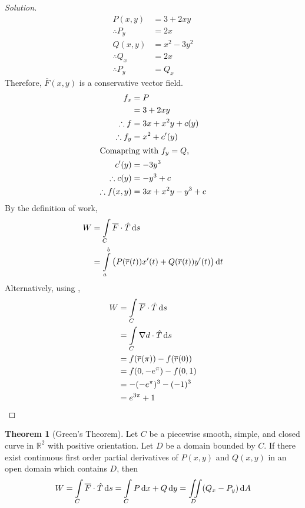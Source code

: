\documentclass[fleqn, a4paper, 10pt]{article}
\theoremstyle{definition}
\theoremstyle{theorem}
\newtheorem{theorem}{Theorem}
\theoremstyle{remark}
\newenvironment{solution}
	{\begin{proof}[Solution]\let\qed\relax}
	{\end{proof}}
\begin{document}
\begin{multicols}{2}
\begin{solution}
	\begin{align*}
		P(x,y) &= 3 + 2xy\\
		\therefore P_y &= 2x\\
		Q(x,y) &= x^2 - 3 y^2\\
		\therefore Q_x &= 2x\\
		\therefore P_y &= Q_x
	\end{align*}
	Therefore, $\overline{F}(x,y)$ is a conservative vector field.
	\begin{align*}
		f_x &= P\\
		&= 3 + 2 x y\\
		\therefore f &= 3x + x^2 y + c(y)\\
		\therefore f_y &= x^2 + c'(y)\\
		\intertext{Comapring with $f_y = Q$,}
		c'(y) &= -3 y^3\\
		\therefore c(y) &= - y^3 + c\\
		\therefore f(x,y) &= 3x + x^2 y - y^3 + c
	\end{align*}
	By the definition of work,
	\begin{align*}
		W &= \int\limits_{C} \overline{F} \cdot \hat{T} \dif s\\
		&= \int\limits_{a}^{b} \left( P(\overline{r}(t)) x'(t) + Q(\overline{r}(t)) y'(t) \right) \dif t
	\end{align*}
	Alternatively, using ,
	\begin{align*}
		W &= \int\limits_{C} \overline{F} \cdot \hat{T} \dif s\\
		&= \int\limits_{C} \nabla d \cdot \hat{T} \dif s\\
		&= f(\overline{r}(\pi)) - f(\overline{r}(0))\\
		&= f(0, -e^{\pi}) - f(0, 1)\\
		&= -(-e^{\pi})^3 - (-1)^3\\
		&= e^{3 \pi} + 1
	\end{align*}
\end{solution}

\begin{theorem}[Green's Theorem]\label{Green's Theorem}
	Let $C$ be a piecewise smooth, simple, and closed curve in $\mathbb{R}^2$ with positive orientation. Let $D$ be a domain bounded by $C$. If there exist continuous first order partial derivatives of $P(x,y)$ and $Q(x,y)$ in an open domain which contains $D$, then
	\begin{equation*}
		W = \int\limits_{C} \overline{F} \cdot \hat{T} \dif s = \int\limits_{C} P \dif x + Q \dif y = \iint\limits_{D} (Q_x - P_y) \dif A
	\end{equation*}
\end{theorem}


\end{multicols}
\end{document}
